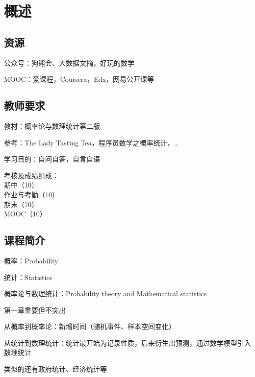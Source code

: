 \def\lecturer{李漫漫}
\def\noter{THF}
\def\className{Probability Theory and Mathematical Statistics}
\def\term{III-B}



\maketitle
\tableofcontents
\section*{概述}%
\label{sec:概述}
\subsection*{资源}%
\label{sub:资源}
公众号：狗熊会、大数据文摘，好玩的数学

MOOC：爱课程，Coursera，Edx，网易公开课等

\subsection*{教师要求}%
\label{sub:教师要求}

教材：概率论与数理统计第二版

参考：The Lady Tasting Tea，程序员数学之概率统计，\ldots

学习目的：自问自答，自言自语

考核及成绩组成：\\期中（10）\\作业与考勤（10）\\期末（70）\\MOOC（10）

\subsection*{课程简介}%
\label{sub:课程简介}
概率：Probability

统计：Statistics

概率论与数理统计：Probability theory and Mathematical statistics

\begin{notation}
第一章重要但不突出
\end{notation}
从概率到概率论：新增时间（随机事件、样本空间变化）

从统计到数理统计：统计最开始为记录性质，后来衍生出预测，通过数学模型引入数理统计

类似的还有政府统计、经济统计等

